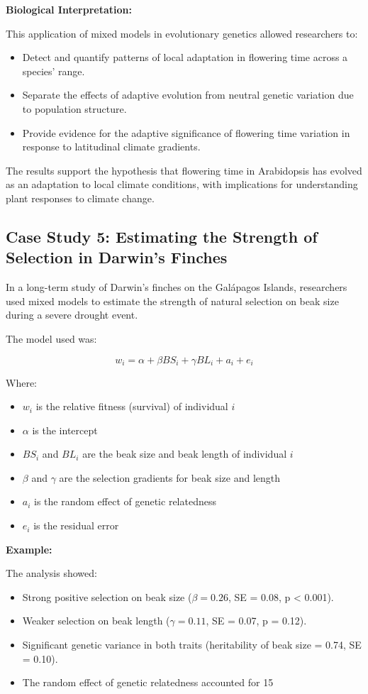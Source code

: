 \documentclass[12pt,a4paper]{article}
\newenvironment{example}[1][]
{\begin{basebox}[linecolor=uqgold]
\textbf{\color{uqgold}Example:} \textit{#1}\par\noindent\ignorespaces}
{\end{basebox}}
\newenvironment{interpretation}[1][]
{\begin{basebox}[linecolor=uqgreen]
\textbf{\color{uqgreen}Biological Interpretation:} \textit{#1}\par\noindent\ignorespaces}
{\end{basebox}}
\begin{document}
\begin{interpretation}
This application of mixed models in evolutionary genetics allowed researchers to:
\begin{itemize}
    \item Detect and quantify patterns of local adaptation in flowering time across a species' range.
    \item Separate the effects of adaptive evolution from neutral genetic variation due to population structure.
    \item Provide evidence for the adaptive significance of flowering time variation in response to latitudinal climate gradients.
\end{itemize}
The results support the hypothesis that flowering time in Arabidopsis has evolved as an adaptation to local climate conditions, with implications for understanding plant responses to climate change.
\end{interpretation}

\subsection{Case Study 5: Estimating the Strength of Selection in Darwin's Finches}

In a long-term study of Darwin's finches on the Galápagos Islands, researchers used mixed models to estimate the strength of natural selection on beak size during a severe drought event.

The model used was:

\[
w_i = \alpha + \beta BS_i + \gamma BL_i + a_i + e_i
\]

Where:
\begin{itemize}
    \item $w_i$ is the relative fitness (survival) of individual $i$
    \item $\alpha$ is the intercept
    \item $BS_i$ and $BL_i$ are the beak size and beak length of individual $i$
    \item $\beta$ and $\gamma$ are the selection gradients for beak size and length
    \item $a_i$ is the random effect of genetic relatedness
    \item $e_i$ is the residual error
\end{itemize}

\begin{example}
The analysis showed:
\begin{itemize}
    \item Strong positive selection on beak size ($\beta = 0.26$, SE = 0.08, p < 0.001).
    \item Weaker selection on beak length ($\gamma = 0.11$, SE = 0.07, p = 0.12).
    \item Significant genetic variance in both traits (heritability of beak size = 0.74, SE = 0.10).
    \item The random effect of genetic relatedness accounted for 15%
\end{itemize}
\end{example}
\end{document}

